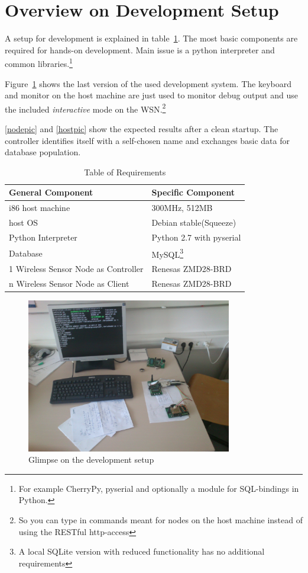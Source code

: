 \section{Overview on Development Setup}

A setup for development is explained in table~\ref{tab:requirements}. The most basic components are 
required for hands-on development. Main issue is a python interpreter and common libraries.\footnote{For example
CherryPy, pyserial and optionally a module for SQL-bindings in Python.}

Figure~\ref{setupic} shows the last version of the used development system. The keyboard and monitor on the host machine
are just used to monitor debug output and use the included \textsl{interactive} mode on the \textsc{WSN}.\footnote{So you can 
type in commands meant for nodes on the host machine instead of using the RESTful http-access}

\ref{nodepic} and \ref{hostpic} show the expected results after a clean startup. The controller identifies itself with a
self-chosen name and exchanges basic data for database population.
 

\begin{table}[h] 
\centering 
\begin{tabular}{|l||l|} 
General Component & Specific Component\\ 
\hline 
i86 host machine & 300MHz, 512MB\\ 
host OS & Debian stable(Squeeze) \\ 
Python Interpreter & Python 2.7 with pyserial \\ 
Database & MySQL\footnote{A local SQLite version with reduced functionality has no additional requirements} \\ 
1 Wireless Sensor Node as Controller & Renesas ZMD28-BRD \\
n Wireless Sensor Node as Client & Renesas ZMD28-BRD \\ 
\end{tabular} 
\caption{ Table of Requirements} 
\label{tab:requirements} 
\end{table}


\begin{figure}[H]
   \centering
   \includegraphics[width=0.8\textwidth]{pic/whole_setup.jpg}%
   \caption{Glimpse on the development setup}
   \label{setupic}%
\end{figure}


